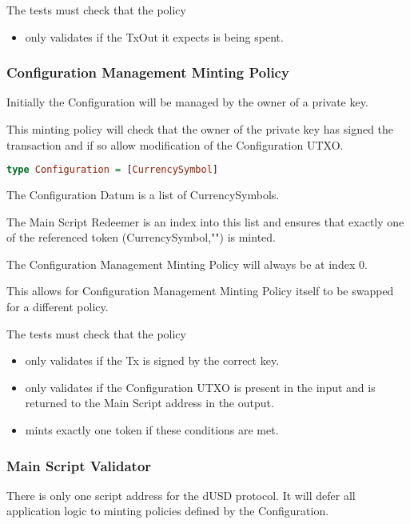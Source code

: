 \documentclass{article} %
\begin{document}
The tests must check that the policy
\begin{itemize}
  \item only validates if the TxOut it expects is being spent.
\end{itemize}

\subsubsection{Configuration Management Minting Policy}
Initially the Configuration will be managed by the owner of a private key.

This minting policy will check that the owner of the private key has signed the transaction and if so allow modification of the Configuration UTXO.

\begin{lstlisting}[language=Haskell]
type Configuration = [CurrencySymbol]
\end{lstlisting}

The Configuration Datum is a list of CurrencySymbols.

The Main Script Redeemer is an index into this list and ensures that exactly one of the referenced token (CurrencySymbol,"") is minted.

The Configuration Management Minting Policy will always be at index 0.

This allows for Configuration Management Minting Policy itself to be swapped for a different policy.

The tests must check that the policy
\begin{itemize}
  \item only validates if the Tx is signed by the correct key.
  \item only validates if the Configuration UTXO is present in the input and is returned to the Main Script address in the output.
  \item mints exactly one token if these conditions are met.
\end{itemize}

\subsubsection{Main Script Validator}
There is only one script address for the dUSD protocol. It will defer all application logic to minting policies defined by the Configuration.
\end{document}
